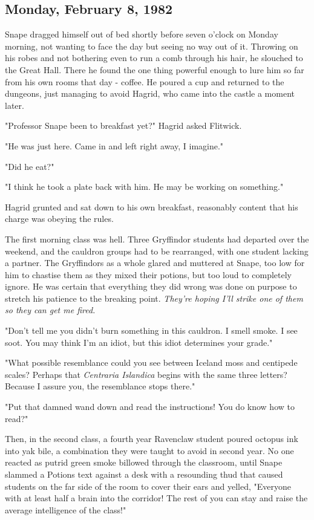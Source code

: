 \subsection{Monday, February 8, 1982}

Snape dragged himself out of bed shortly before seven o'clock on Monday morning, not wanting to face the day but seeing no way out of it. Throwing on his robes and not bothering even to run a comb through his hair, he slouched to the Great Hall. There he found the one thing powerful enough to lure him so far from his own rooms that day - coffee. He poured a cup and returned to the dungeons, just managing to avoid Hagrid, who came into the castle a moment later.

"Professor Snape been to breakfast yet?" Hagrid asked Flitwick.

"He was just here. Came in and left right away, I imagine."

"Did he eat?"

"I think he took a plate back with him. He may be working on something."

Hagrid grunted and sat down to his own breakfast, reasonably content that his charge was obeying the rules.

The first morning class was hell. Three Gryffindor students had departed over the weekend, and the cauldron groups had to be rearranged, with one student lacking a partner. The Gryffindors as a whole glared and muttered at Snape, too low for him to chastise them as they mixed their potions, but too loud to completely ignore. He was certain that everything they did wrong was done on purpose to stretch his patience to the breaking point. \emph{They're hoping I'll strike one of them so they can get me fired.}

"Don't tell me you didn't burn something in this cauldron. I smell smoke. I see soot. You may think I'm an idiot, but this idiot determines your grade."

"What possible resemblance could you see between Iceland moss and centipede scales? Perhaps that \emph{Centraria Islandica} begins with the same three letters? Because I assure you, the resemblance stops there."

"Put that damned wand down and read the instructions! You do know how to read?"

Then, in the second class, a fourth year Ravenclaw student poured octopus ink into yak bile, a combination they were taught to avoid in second year. No one reacted as putrid green smoke billowed through the classroom, until Snape slammed a Potions text against a desk with a resounding thud that caused students on the far side of the room to cover their ears and yelled, "Everyone with at least half a brain into the corridor! The rest of you can stay and raise the average intelligence of the class!"

